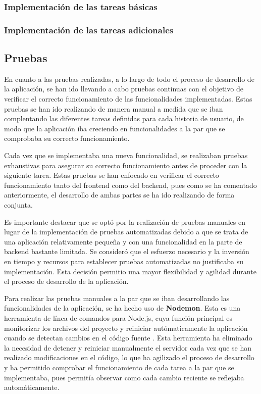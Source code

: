 \documentclass[12pt]{article}
\begin{document}
\subsubsection{Implementación de las tareas básicas}

\subsubsection{Implementación de las tareas adicionales}


\subsection{Pruebas}
En cuanto a las pruebas realizadas, a lo largo de todo el proceso de desarrollo de la aplicación, se han ido llevando a cabo pruebas continuas
con el objetivo de verificar el correcto funcionamiento de las funcionalidades implementadas. Estas pruebas se han ido realizando de manera manual 
a medida que se iban complentando las diferentes tareas definidas para cada historia de usuario, de modo que la aplicación iba creciendo en funcionalidades 
a la par que se comprobaba su correcto funcionamiento.

Cada vez que se implementaba una nueva funcionalidad, se realizaban pruebas exhaustivas para asegurar su correcto funcionamiento antes de proceder con la 
siguiente tarea. Estas pruebas se han enfocado en verificar el correcto funcionamiento tanto del frontend como del backend, pues como se ha comentado anteriormente, 
el desarrollo de ambas partes se ha ido realizando de forma conjunta.

Es importante destacar que se optó por la realización de pruebas manuales en lugar de la implementación de pruebas automatizadas debido a que se 
trata de una aplicación relativamente pequeña y con una funcionalidad en la parte de backend bastante limitada. Se consideró que el esfuerzo necesario y la inversión
en tiempo y recursos para establecer pruebas automatizadas no justificaba su implementación. Esta decisión permitio una mayor flexibilidad y agilidad durante
el proceso de desarrollo de la aplicación.

Para realizar las pruebas manuales a la par que se iban desarrollando las funcionalidades de la aplicación, se ha hecho uso de \textbf{Nodemon}. 
Esta es una herramienta de línea de comandos para Node.js, cuya función principal es monitorizar los archivos del proyecto y reiniciar autómaticamente
la aplicación cuando se detectan cambios en el código fuente \cite{nodemon}. 
Esta herramienta ha eliminado la necesidad de detener y reiniciar manualmente el servidor cada vez que se han realizado modificaciones en el código, 
lo que ha agilizado el proceso de desarrollo y ha permitido comprobar el funcionamiento de cada tarea a la par que se implementaba, pues permitía observar como
cada cambio reciente se reflejaba automáticamente.
\end{document}
